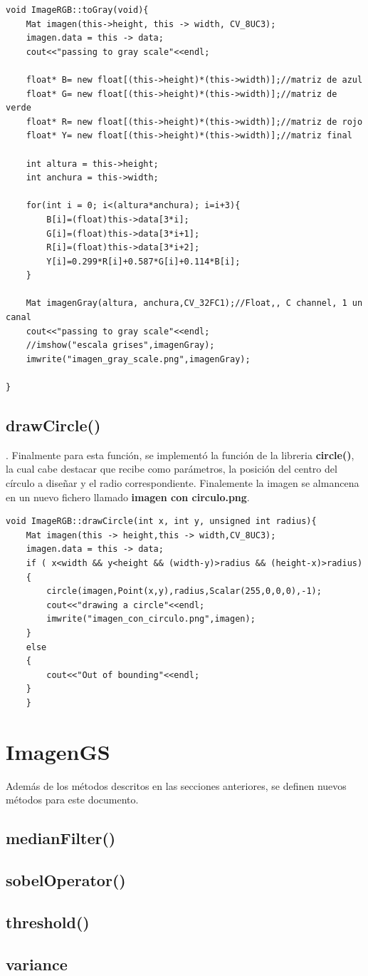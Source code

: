 \documentclass{article}
\begin{document}
\begin{verbatim}
void ImageRGB::toGray(void){
	Mat imagen(this->height, this -> width, CV_8UC3);
	imagen.data = this -> data;
	cout<<"passing to gray scale"<<endl;
	
	float* B= new float[(this->height)*(this->width)];//matriz de azul
	float* G= new float[(this->height)*(this->width)];//matriz de verde
	float* R= new float[(this->height)*(this->width)];//matriz de rojo
	float* Y= new float[(this->height)*(this->width)];//matriz final

	int altura = this->height;
	int anchura = this->width;

	for(int i = 0; i<(altura*anchura); i=i+3){
		B[i]=(float)this->data[3*i];
		G[i]=(float)this->data[3*i+1];
		R[i]=(float)this->data[3*i+2];
		Y[i]=0.299*R[i]+0.587*G[i]+0.114*B[i];
	}

	Mat imagenGray(altura, anchura,CV_32FC1);//Float,, C channel, 1 un canal
	cout<<"passing to gray scale"<<endl;
	//imshow("escala grises",imagenGray);
	imwrite("imagen_gray_scale.png",imagenGray);
	
}
\end{verbatim}

\subsection{drawCircle()}.
Finalmente para esta funci\' on, se implement\' o la funci\' on de la libreria \textbf{circle()}, la cual cabe destacar que recibe como par\' ametros, la posici\' on del centro del c\' irculo a dise\~ nar y el radio correspondiente.
Finalemente la imagen se almancena en un nuevo fichero llamado \textbf{imagen con circulo.png}.

\begin{verbatim}
void ImageRGB::drawCircle(int x, int y, unsigned int radius){
	Mat imagen(this -> height,this -> width,CV_8UC3);
	imagen.data = this -> data;
	if ( x<width && y<height && (width-y)>radius && (height-x)>radius)
	{
		circle(imagen,Point(x,y),radius,Scalar(255,0,0,0),-1);
		cout<<"drawing a circle"<<endl;
		imwrite("imagen_con_circulo.png",imagen);
	}
	else
	{
		cout<<"Out of bounding"<<endl;
	}
	}
\end{verbatim}

\section{ImagenGS}
Adem\' as de los m\' etodos descritos en las secciones anteriores, se definen nuevos m\' etodos para este documento.

\subsection{medianFilter()}

\subsection{sobelOperator()}

\subsection{threshold()}

\subsection{variance}
\end{document}
